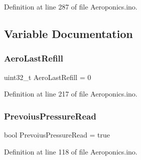 Definition at line 287 of file Aeroponics.\+ino.



\subsection{Variable Documentation}
\mbox{\label{_aeroponics_8ino_a77df1b16c77d0eb7c47f8a15b6dfe425}} 
\subsubsection{\texorpdfstring{AeroLastRefill}{AeroLastRefill}}
{\footnotesize\ttfamily uint32\+\_\+t Aero\+Last\+Refill = 0}



Definition at line 217 of file Aeroponics.\+ino.

\mbox{\label{_aeroponics_8ino_ad04b57c789ee14d3cb605c29ee802570}} 
\subsubsection{\texorpdfstring{PrevoiusPressureRead}{PrevoiusPressureRead}}
{\footnotesize\ttfamily bool Prevoius\+Pressure\+Read = true}



Definition at line 118 of file Aeroponics.\+ino.

